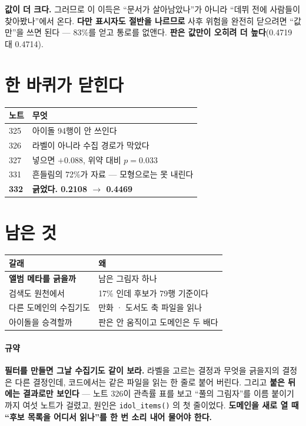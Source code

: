 \documentclass[10pt]{article}
\begin{document}
\textbf{값이 더 크다.} 그러므로 이 이득은 ``문서가 살아남았나''가 아니라
``데뷔 전에 사람들이 찾아봤나''에서 온다. \textbf{다만 표시자도 절반을
나르므로} 사후 위험을 완전히 닫으려면 ``값만''을 쓰면 된다 --- 83\%를
얻고 통로를 없앤다. \textbf{판은 값만이 오히려 더 높다}(0.4719 대 0.4714).

\section{한 바퀴가 닫힌다}

\begin{center}\footnotesize
\begin{tabular}{ll}
\hline
노트 & 무엇 \\
\hline
325 & 아이돌 94행이 안 쓰인다 \\
326 & 라벨이 아니라 수집 경로가 막았다 \\
327 & 넣으면 $+$0.088, 위약 대비 $p{=}0.033$ \\
331 & 흔들림의 72\%가 자료 --- 모형으로는 못 내린다 \\
\textbf{332} & \textbf{긁었다. 0.2108 $\to$ 0.4469} \\
\hline
\end{tabular}
\end{center}

\section{남은 것}
\begin{center}\footnotesize
\begin{tabular}{ll}
\hline
갈래 & 왜 \\
\hline
\textbf{앨범 메타를 긁을까} & 남은 그림자 하나 \\
검색도 원천에서 & 17\% 인데 후보가 79행 기준이다 \\
다른 도메인의 수집기도 & 만화 · 도서도 축 파일을 읽나 \\
아이돌을 승격할까 & 판은 안 움직이고 도메인은 두 배다 \\
\hline
\end{tabular}
\end{center}

\paragraph{규약} \textbf{필터를 만들면 그날 수집기도 같이 보라.} 라벨을
고르는 결정과 무엇을 긁을지의 결정은 다른 결정인데, 코드에서는 같은 파일을
읽는 한 줄로 붙어 버린다. 그리고 \textbf{붙은 뒤에는 결과로만 보인다} ---
노트 326이 관측률 표를 보고 ``풀의 그림자''를 이름 붙이기까지 여섯 노트가
걸렸고, 원인은 \texttt{idol\_items()} 의 첫 줄이었다. \textbf{도메인을
새로 열 때 ``후보 목록을 어디서 읽나''를 한 번 소리 내어 물어야 한다.}
\end{document}

